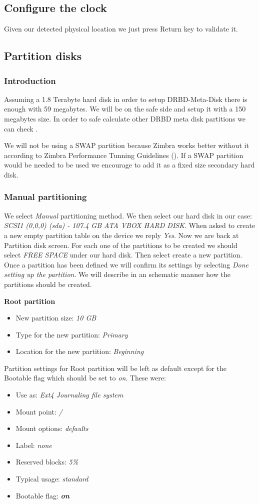 \subsection {Configure the clock}
Given our detected physical location we just press Return key to validate it.
\subsection {Partition disks}
\subsubsection {Introduction}
Assuming a 1.8 Terabyte hard disk in order to setup DRBD-Meta-Disk there is enough with 59 megabytes. We will be on the safe side and setup it with a 150 megabytes size. In order to safe calculate other DRBD meta disk partitions we can check \cite{LinbitDRBDInternals}.

We will not be using a SWAP partition because Zimbra works better without it according to Zimbra Performance Tunning Guidelines (\cite{ZimbraPerformanceTuning}). If a SWAP partition would be needed to be used we encourage to add it as a fixed size secondary hard disk.

\subsubsection {Manual partitioning}
We select \textit{Manual} partitioning method. We then select our hard disk in our case: \textit{SCSI1 (0,0,0) (sda) - 107.4 GB ATA VBOX HARD DISK}. When asked to create a new empty partition table on the device we reply \textit{Yes}.
Now we are back at Partition disk screen. For each one of the partitions to be created we should select \textit{FREE SPACE} under our hard disk. Then select create a new partition.  Once a partition has been defined we will confirm its settings by selecting \textit{Done setting up the partition}. We will describe in an schematic manner how the partitions should be created.

\textbf{Root partition}
\begin{itemize}
  \item New partition size: \textit{10 GB}
  \item Type for the new partition: \textit {Primary}
  \item Location for the new partition: \textit{Beginning}
\end{itemize}
Partition settings for Root partition will be left as default except for the Bootable flag which should be set to \textit{on}. These were:
\begin{itemize}
  \item Use as: \textit{Ext4 Journaling file system}
  \item Mount point: \textit{/}
  \item Mount options: \textit{defaults}
  \item Label:	\textit{none}
  \item Reserved blocks: \textit{5\%}
  \item Typical usage: \textit{standard}
  \item Bootable flag: \textbf{\textit{on}}
\end{itemize}


